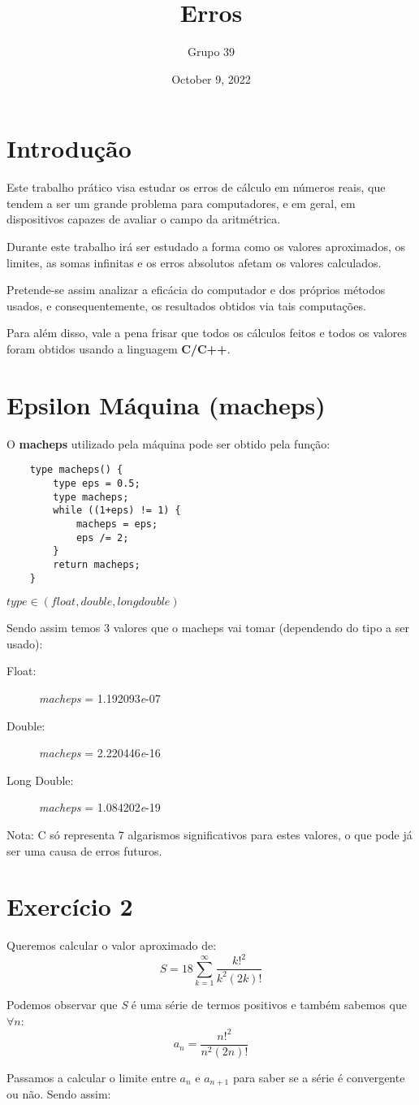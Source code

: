 \documentclass[12pt, letterpaper]{article}
\title{Erros}
\author{Grupo 39}
\date{October 9, 2022}
\begin{document}
\maketitle

\section*{Introdução}

Este trabalho prático visa estudar os erros de cálculo em números reais, que tendem a ser um grande problema para computadores, e em geral, em dispositivos capazes de avaliar o campo da aritmétrica.

Durante este trabalho irá ser estudado a forma como os valores aproximados, os limites, as somas infinitas e os erros absolutos afetam os valores calculados. 

Pretende-se assim analizar a eficácia do computador e dos próprios métodos usados, e consequentemente, os resultados obtidos via tais computações.

Para além disso, vale a pena frisar que todos os cálculos feitos e todos os valores foram obtidos usando a linguagem \textbf{C/C++}. 

\section*{Epsilon Máquina (macheps)}
O \textbf{macheps} utilizado pela máquina pode ser obtido pela função:
\begin{verbatim}
    type macheps() {
        type eps = 0.5;
        type macheps;
        while ((1+eps) != 1) {
            macheps = eps;
            eps /= 2;
        }
        return macheps;
    }
\end{verbatim}

$type \in (float, double, long double)$

Sendo assim temos 3 valores que o macheps vai tomar (dependendo do tipo a ser usado):

\begin{description}
    \item[Float:]\textit{macheps} = 1.192093\textit{e}-07
    \item[Double:]\textit{macheps} = 2.220446\textit{e}-16
    \item[Long Double:]\textit{macheps} = 1.084202\textit{e}-19
\end{description}

\small Nota: C só representa 7 algarismos significativos para estes valores, o que pode já ser uma causa de erros futuros.

\section*{Exercício 2}
Queremos calcular o valor aproximado de:
\[S=18\sum_{k=1}^{\infty}\frac{k!^2}{k^2(2k)!}\]

Podemos observar que \textit{S} é uma série de termos positivos e também sabemos que $\forall n$:
$$a_n = \frac{n!^2}{n^2(2n)!}$$
\newline

Passamos a calcular o limite entre $a_n$ e $a_{n+1}$ para saber se a série é convergente ou não. Sendo assim:
\end{document}
